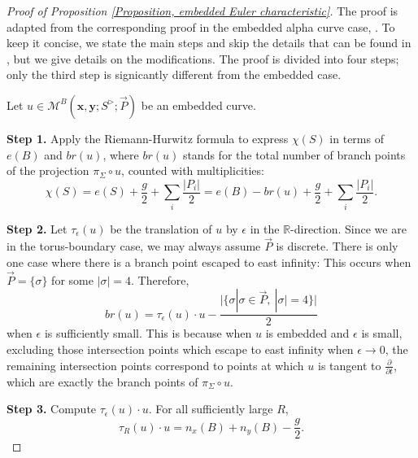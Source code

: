 \documentclass{amsart}
\theoremstyle{definition}
\theoremstyle{remark}
\numberwithin{equation}{section}
\numberwithin{equation}{section} \makeatletter
\begin{document}
\begin{proof}[Proof of Proposition \ref{Proposition, embedded Euler characteristic}]
The proof is adapted from the corresponding proof in the embedded alpha curve case, \cite[Proposition 5.69]{LOT18}. To keep it concise, we state the main steps and skip the details that can be found in \cite{LOT18}, but we give details on the modifications. The proof is divided into four steps; only the third step is signicantly different from the embedded case.

Let $u\in \mathcal{M}^B(\bm{x},\bm{y};S^\triangleright;\overrightarrow{P})$ be an embedded curve.

\textbf{Step 1.} Apply the Riemann-Hurwitz formula to express $\chi(S)$ in terms of $e(B)$ and $br(u)$, where $br(u)$ stands for the total number of branch points of the projection $\pi_\Sigma\circ u$, counted with multiplicities: 
\begin{equation}\label{Equation, Euler char of sources of embedded curve}
\chi(S)=e(S)+\frac{g}{2}+\sum_{i} \frac{|P_i|}{2}=e(B)-br(u)+\frac{g}{2}+\sum_{i} \frac{|P_i|}{2}.
\end{equation}


\textbf{Step 2.} Let $\tau_\epsilon(u)$ be the translation of $u$ by $\epsilon$ in the $\mathbb{R}$-direction. Since we are in the torus-boundary case, we may always assume $\overrightarrow{P}$ is discrete. There is only one case where there is a branch point escaped to east infinity: This occurs when $\overrightarrow{P}=\{\sigma\}$ for some $|\sigma|=4$. Therefore, 
\begin{equation}\label{Equation, branch points of holomorphic curve projection}
br(u)=\tau_\epsilon(u)\cdot u-\frac{\vert\{\sigma|{\sigma}\in \overrightarrow{P},\ |\sigma|=4\}\vert}{2} 
\end{equation}
when $\epsilon$ is sufficiently small. This is because when $u$ is embedded and $\epsilon$ is small, excluding those intersection points which escape to east infinity when $\epsilon\rightarrow0$, the remaining intersection points correspond to points at which $u$ is tangent to $\frac{\partial}{\partial t}$, which are exactly the branch points of $\pi_{\Sigma}\circ u$. 

\textbf{Step 3.} Compute $\tau_\epsilon(u)\cdot u$. For all sufficiently large $R$, 
\begin{equation}\label{Equation, intersection number, large R}
\tau_R(u)\cdot u=n_x(B)+n_y(B)-\frac{g}{2}.
\end{equation}


\end{proof}
\end{document}
